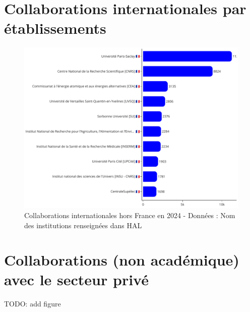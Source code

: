 \documentclass[french, 11pt]{../../dibiso/biso}
\begin{document}






\pagebreak

\section{Collaborations internationales par établissements}

\begin{figure}[!h]
  \includegraphics[width=\textwidth]{figures/collaboration_names.pdf}
  \caption{Collaborations internationales hors France en 2024 - Données : Nom des institutions renseignées dans HAL}
  \label{fig_collab_names}
\end{figure}







\pagebreak

\section{Collaborations (non académique) avec le secteur privé}

TODO: add figure
\end{document}
